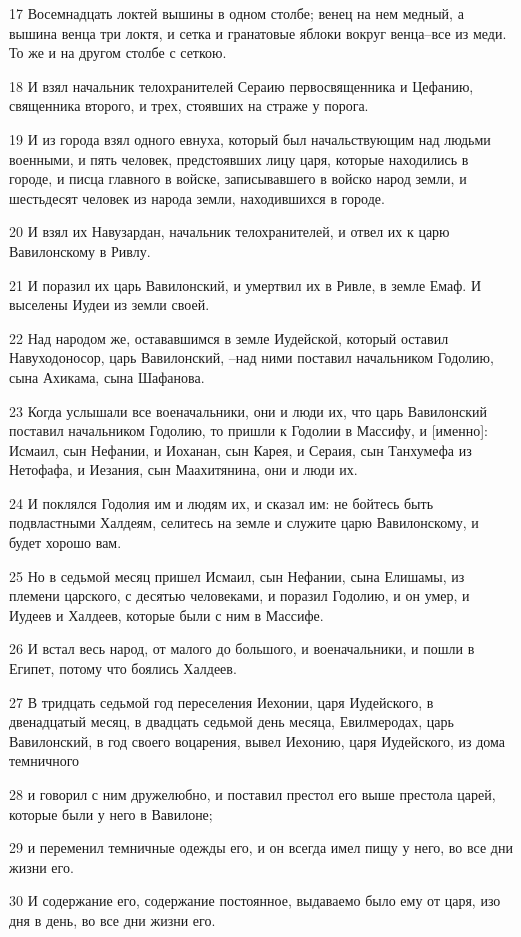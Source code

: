 \par 17 Восемнадцать локтей вышины в одном столбе; венец на нем медный, а вышина венца три локтя, и сетка и гранатовые яблоки вокруг венца--все из меди. То же и на другом столбе с сеткою.
\par 18 И взял начальник телохранителей Сераию первосвященника и Цефанию, священника второго, и трех, стоявших на страже у порога.
\par 19 И из города взял одного евнуха, который был начальствующим над людьми военными, и пять человек, предстоявших лицу царя, которые находились в городе, и писца главного в войске, записывавшего в войско народ земли, и шестьдесят человек из народа земли, находившихся в городе.
\par 20 И взял их Навузардан, начальник телохранителей, и отвел их к царю Вавилонскому в Ривлу.
\par 21 И поразил их царь Вавилонский, и умертвил их в Ривле, в земле Емаф. И выселены Иудеи из земли своей.
\par 22 Над народом же, остававшимся в земле Иудейской, который оставил Навуходоносор, царь Вавилонский, --над ними поставил начальником Годолию, сына Ахикама, сына Шафанова.
\par 23 Когда услышали все военачальники, они и люди их, что царь Вавилонский поставил начальником Годолию, то пришли к Годолии в Массифу, и [именно]: Исмаил, сын Нефании, и Иоханан, сын Карея, и Сераия, сын Танхумефа из Нетофафа, и Иезания, сын Маахитянина, они и люди их.
\par 24 И поклялся Годолия им и людям их, и сказал им: не бойтесь быть подвластными Халдеям, селитесь на земле и служите царю Вавилонскому, и будет хорошо вам.
\par 25 Но в седьмой месяц пришел Исмаил, сын Нефании, сына Елишамы, из племени царского, с десятью человеками, и поразил Годолию, и он умер, и Иудеев и Халдеев, которые были с ним в Массифе.
\par 26 И встал весь народ, от малого до большого, и военачальники, и пошли в Египет, потому что боялись Халдеев.
\par 27 В тридцать седьмой год переселения Иехонии, царя Иудейского, в двенадцатый месяц, в двадцать седьмой день месяца, Евилмеродах, царь Вавилонский, в год своего воцарения, вывел Иехонию, царя Иудейского, из дома темничного
\par 28 и говорил с ним дружелюбно, и поставил престол его выше престола царей, которые были у него в Вавилоне;
\par 29 и переменил темничные одежды его, и он всегда имел пищу у него, во все дни жизни его.
\par 30 И содержание его, содержание постоянное, выдаваемо было ему от царя, изо дня в день, во все дни жизни его.


